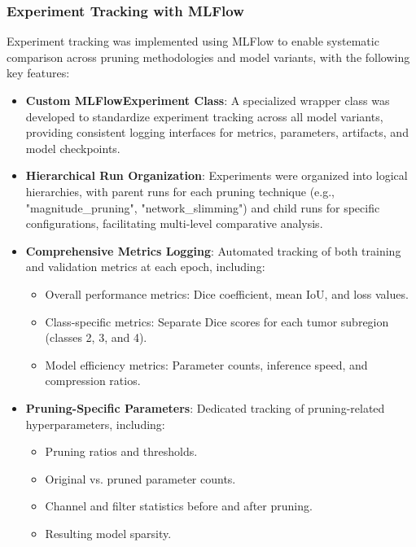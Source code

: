 \documentclass[12pt,a4paper]{article}
\begin{document}
\begin{enumerate}
\subsubsection{Experiment Tracking with MLFlow}
Experiment tracking was implemented using MLFlow to enable systematic comparison across pruning methodologies and model variants, with the following key features:

\begin{itemize}
    \item \textbf{Custom MLFlowExperiment Class}: A specialized wrapper class was developed to standardize experiment tracking across all model variants, providing consistent logging interfaces for metrics, parameters, artifacts, and model checkpoints.
    
    \item \textbf{Hierarchical Run Organization}: Experiments were organized into logical hierarchies, with parent runs for each pruning technique (e.g., "magnitude\_pruning", "network\_slimming") and child runs for specific configurations, facilitating multi-level comparative analysis.
    
    \item \textbf{Comprehensive Metrics Logging}: Automated tracking of both training and validation metrics at each epoch, including:
    \begin{itemize}
        \item Overall performance metrics: Dice coefficient, mean IoU, and loss values.
        \item Class-specific metrics: Separate Dice scores for each tumor subregion (classes 2, 3, and 4).
        \item Model efficiency metrics: Parameter counts, inference speed, and compression ratios.
    \end{itemize}
    
    \item \textbf{Pruning-Specific Parameters}: Dedicated tracking of pruning-related hyperparameters, including:
    \begin{itemize}
        \item Pruning ratios and thresholds.
        \item Original vs. pruned parameter counts.
        \item Channel and filter statistics before and after pruning.
        \item Resulting model sparsity.
    \end{itemize}
    

\end{itemize}
\end{enumerate}
\end{document}
